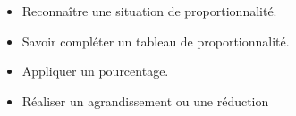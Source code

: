 \begin{myobj}
	\begin{itemize}
		\item Reconnaître une situation de proportionnalité.
		\item Savoir compléter un tableau de proportionnalité.
		\item Appliquer un pourcentage.
		\item Réaliser un agrandissement ou une réduction
	\end{itemize}
\end{myobj}

%
%		



